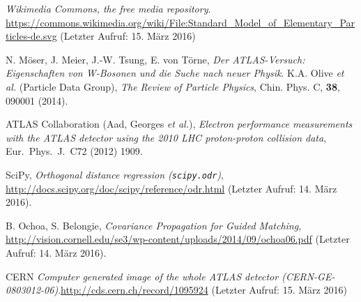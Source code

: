 \documentclass[11pt, a4paper]{article}
\numberwithin{equation}{section}
\begin{document}
\FloatBarrier
\vspace{\fill}
\begin{thebibliography}{19}
	\emph{Wikimedia Commons, the free media repository}. \url{https://commons.wikimedia.org/wiki/File:Standard_Model_of_Elementary_Particles-de.svg} (Letzter Aufruf: 15. März 2016)
	
	N. Möser, J. Meier, J.-W. Tsung, E. von Törne,
	\emph{Der ATLAS-Versuch: Eigenschaften von W-Bosonen und die Suche nach neuer Physik}.
	K.A. Olive \textit{et al.} (Particle Data Group),
	\emph{The Review of Particle Physics},
	Chin. Phys. C, \textbf{38}, 090001 (2014).

	ATLAS Collaboration (Aad, Georges \textit{et al.}),
	\emph{Electron performance measurements with the ATLAS detector using the 2010 LHC proton-proton collision data},
	Eur.\ Phys.\ J.\ C72 (2012) 1909.

	SciPy,
	\emph{Orthogonal distance regression (\texttt{scipy.odr})},
	\url{http://docs.scipy.org/doc/scipy/reference/odr.html} (Letzter Aufruf: 14. März 2016).

	B. Ochoa, S. Belongie,
	\emph{Covariance Propagation for Guided Matching},
	\url{http://vision.cornell.edu/se3/wp-content/uploads/2014/09/ochoa06.pdf} (Letzter Aufruf: 14. März 2016).
	
	CERN \emph{Computer generated image of the whole ATLAS detector (CERN-GE-0803012-06)}.\url{http://cds.cern.ch/record/1095924} (Letzter Aufruf: 15. März 2016)
\end{thebibliography}
\end{document}
